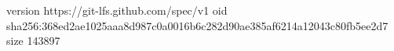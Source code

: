 version https://git-lfs.github.com/spec/v1
oid sha256:368ed2ae1025aaa8d987c0a0016b6c282d90ae385af6214a12043c80fb5ee2d7
size 143897
